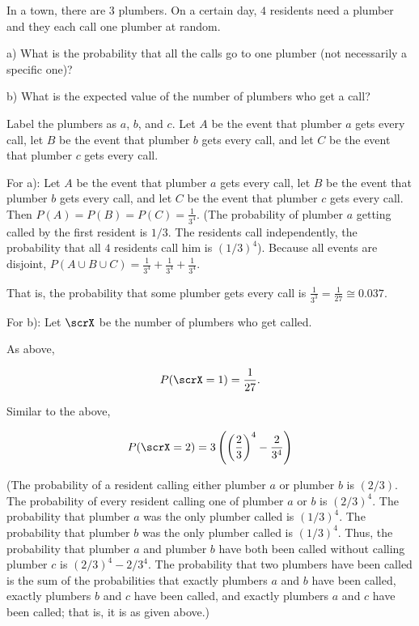 \begin{problem}[Handout 3, \# 5]
  In a town, there are \(3\) plumbers. On a certain day, \(4\) residents
  need a plumber and they each call one plumber at random.
  
  a) What is the probability that all the calls go to one plumber (not necessarily a specific one)?
  
  b) What is the expected value of the number of plumbers who get a call?
\end{problem}
\begin{solution}

Label the plumbers as $a$, $b$, and $c$. Let $A$ be the event that plumber $a$ gets every call, let $B$ be the event that plumber $b$ gets every call, and let $C$ be the event that plumber $c$ gets every call.

For a): Let $A$ be the event that plumber $a$ gets every call, let $B$ be the event that plumber $b$ gets every call, and let $C$ be the event that plumber $c$ gets every call.
Then $P(A) = P(B) = P(C) = \frac{1}{3^4}$. (The probability of plumber $a$ getting called by the first resident is $1/3$. The residents call independently, the probability that all $4$ residents call him is $(1/3)^4$). Because all events are disjoint, $P(A \cup B \cup C) = \frac{1}{3^4} + \frac{1}{3^4} + \frac{1}{3^4}$.

That is, the probability that some plumber gets every call is $\frac{1}{3^3} = \frac{1}{27} \cong 0.037$.

For b): Let $\scrX$ be the number of plumbers who get called.

As above, 

\[
P(\scrX = 1) = \frac{1}{27}.
\]

Similar to the above,

\[
P(\scrX = 2) = 3\left(\left(\frac{2}{3}\right)^4 - \frac{2}{3^4} \right)
\]

(The probability of a resident calling either plumber $a$ or plumber $b$ is $(2/3)$. The probability of every resident calling one of plumber $a$ or $b$ is $(2/3)^4$. The probability that plumber $a$ was the only plumber called is $(1/3)^4$. The probability that plumber $b$ was the only plumber called is $(1/3)^4$. Thus, the probability that plumber $a$ and plumber $b$ have both been called without calling plumber $c$ is $(2/3)^4 - 2/3^4$. The probability that two plumbers have been called is the sum of the probabilities that exactly plumbers $a$ and $b$ have been called, exactly plumbers $b$ and $c$ have been called, and exactly plumbers $a$ and $c$ have been called; that is, it is as given above.)


\end{solution}
